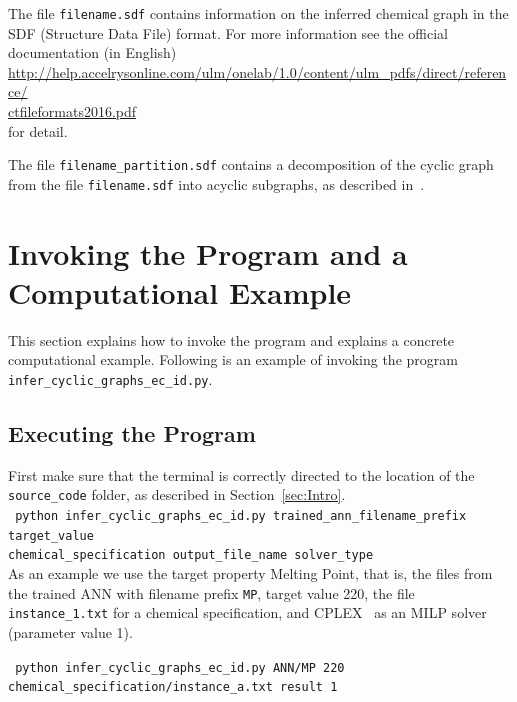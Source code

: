 \documentclass[11pt,titlepage,dvipdfmx,twoside]{book}
\begin{document}
\noindent
The file {\tt filename.sdf} contains information
on the inferred chemical graph in the SDF (Structure Data File)
format.
For more information see the official documentation (in English) \\
\url{http://help.accelrysonline.com/ulm/onelab/1.0/content/ulm_pdfs/direct/reference/}\\
 \url{ctfileformats2016.pdf} \\
for detail.

\noindent
The file {\tt filename\_partition.sdf} contains a 
decomposition of the cyclic graph from the 
file {\tt filename.sdf} into acyclic subgraphs,
as described in~\cite{AN20}.



\section{Invoking the Program and a Computational Example}
\label{sec:Exp}

This section explains how to invoke the program
and explains a concrete computational example.
Following is an example of invoking the
program {\tt infer\_cyclic\_graphs\_ec\_id.py}.

 


\subsection{Executing the Program}
\label{sec:Exp_1}

First make sure that the terminal is 
correctly directed to the location
of the {\tt source\_code} folder, as described in Section~\ref{sec:Intro}. \\

\noindent
{\tt 
 python  infer\_cyclic\_graphs\_ec\_id.py 
trained\_ann\_filename\_prefix
target\_value \\
 \phantom{python } 
 chemical\_specification
output\_file\_name
solver\_type
 }\\


As an example we use the target property Melting Point, 
that is, the files from the trained ANN with filename prefix {\tt MP},
target value 220,
the file {\tt instance\_1.txt} for a chemical specification,
and CPLEX~\cite{cplex} as an MILP solver (parameter value 1).

{\tt 
 python infer\_cyclic\_graphs\_ec\_id.py 
ANN/MP
220 \\
 \phantom{python } 
chemical\_specification/instance\_a.txt
result
1
 }\\
\end{document}
